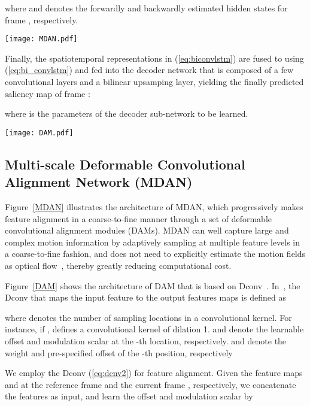 \documentclass[review]{elsarticle}
\begin{document}
where  and  denotes the forwardly and backwardly estimated hidden states for frame , respectively.
\begin{figure*}[t]
\centering
\texttt{[image: MDAN.pdf]}
\caption{Architecture of MDAN.}
\label{MDAN}
\end{figure*}

Finally, the spatiotemporal representations  in (\ref{eq:biconvlstm}) are fused to  using (\ref{eq:bi_convlstm}) and fed into the decoder network  that is composed of a few convolutional layers and a bilinear upsamping layer, yielding the finally predicted saliency map of frame :

where  is the parameters of the decoder sub-network to be learned.
\begin{figure*}[t]
\centering
\texttt{[image: DAM.pdf]}
\caption{Architecture of DAM.}
\label{DAM}
\end{figure*}
\subsection{Multi-scale Deformable Convolutional Alignment Network (MDAN)}
Figure~\ref{MDAN} illustrates the architecture of MDAN, which progressively makes feature alignment in a coarse-to-fine manner through a set of deformable convolutional alignment modules (DAMs).
MDAN can well capture large and complex motion information by adaptively sampling at multiple feature levels in a coarse-to-fine fashion, and does not need to explicitly estimate the motion fields as optical flow~\cite{bak2017spatio,jiang2017predicting,lai2019video,lai2019video}, thereby greatly reducing computational cost.


Figure~\ref{DAM} shows the architecture of DAM that is based on Dconv~\cite{zhu2019deformable}.
In~\cite{zhu2019deformable}, the Dconv that maps the input feature  to the output features maps  is defined as

where  denotes the number of sampling locations in a convolutional kernel. For instance, if ,  defines a  convolutional kernel of dilation 1.  and  denote the learnable offset and modulation scalar at the -th location, respectively.  and  denote the weight and pre-specified offset of the -th position, respectively



We employ the Dconv (\ref{eq:dcnv2}) for feature alignment. Given the feature maps  and  at the reference frame  and the current frame , respectively, we concatenate the features  as input, and learn the offset and modulation scalar by
\end{document}
